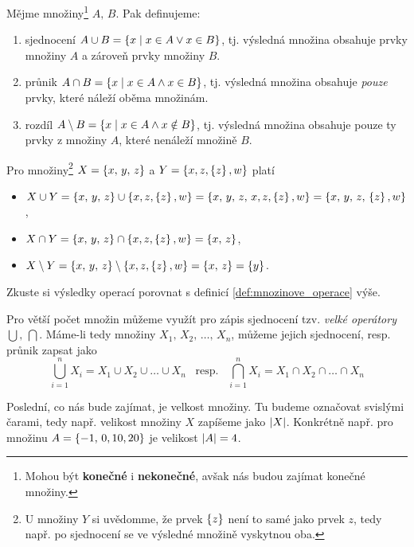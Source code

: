 \begin{definition}\label{def:mnozinove_operace}
    Mějme množiny\footnote{Mohou být \textbf{konečné} i \textbf{nekonečné}, avšak nás budou zajímat konečné množiny.} $A,\,B$. Pak definujeme:
    \begin{enumerate}[label=(\roman*)]
        \item sjednocení $A \cup B = \left\{x \;\middle\vert\; x\in A \lor x\in B\right\}$, tj. výsledná množina obsahuje prvky množiny $A$ a zároveň prvky množiny $B$.
        \item průnik $A \cap B = \left\{x \;\middle\vert\; x\in A \land x\in B\right\}$, tj. výsledná množina obsahuje \emph{pouze} prvky, které náleží oběma množinám.
        \item rozdíl $A \setminus B = \left\{x \;\middle\vert\; x\in A \land x \notin B\right\}$, tj. výsledná množina obsahuje pouze ty prvky z množiny $A$, které nenáleží množině $B$.
    \end{enumerate}
\end{definition}

\begin{example}
    Pro množiny\footnote{U množiny $Y$ si uvědomme, že prvek $\left\{z\right\}$ není to samé jako prvek $z$, tedy např. po sjednocení se ve výsledné množině vyskytnou oba.} $X=\left\{x,\,y,\,z\right\}$ a $Y=\left\{x,z,\left\{z\right\},w\right\}$ platí
    \begin{itemize}
        \item $X \cup Y = \left\{x,\,y,\,z\right\} \cup \left\{x,z,\left\{z\right\},w\right\}=\left\{x,\,y,\,z,\,x,z,\left\{z\right\},w\right\}=\left\{x,\,y,\,z,\,\left\{z\right\},w\right\}$,
        \item $X \cap Y = \left\{x,\,y,\,z\right\} \cap \left\{x,z,\left\{z\right\},w\right\}=\left\{x,\,z\right\}$,
        \item $X \setminus Y = \left\{x,\,y,\,z\right\} \setminus \left\{x,z,\left\{z\right\},w\right\}=\left\{x,\,z\right\}=\left\{y\right\}$.
    \end{itemize}
    Zkuste si výsledky operací porovnat s definicí \ref{def:mnozinove_operace} výše.
\end{example}

Pro větší počet množin můžeme využít pro zápis sjednocení tzv. \emph{velké operátory} $\bigcup,\,\bigcap$. Máme-li tedy množiny $X_1,\,X_2,\,\dots,\,X_n$, můžeme jejich sjednocení, resp. průnik zapsat jako
\begin{equation*}
    \bigcup\limits_{i=1}^{n}X_i = X_1 \cup X_2 \cup \dots \cup X_n\;\;\;\text{resp.}\;\;\;\bigcap\limits_{i=1}^{n}X_i = X_1 \cap X_2 \cap \dots \cap X_n
\end{equation*}

Poslední, co nás bude zajímat, je velkost množiny. Tu budeme označovat svislými čarami, tedy např. velikost množiny $X$ zapíšeme jako $\left| X \right|$. Konkrétně např. pro množinu $A=\left\{-1,\,0,10,20\right\}$ je velikost $\left| A \right|=4$.

